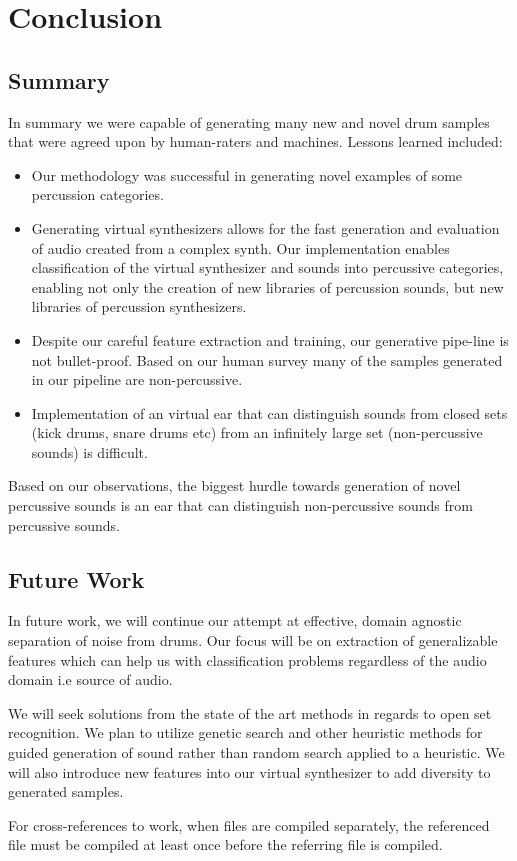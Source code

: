 \documentclass[\main/thesis.tex]{subfiles}
\begin{document}
\chapter{Conclusion}

\section{Summary}
\balance

In summary we were capable of generating many new and novel drum samples that were agreed upon by human-raters and machines. Lessons learned included:

\begin{itemize}
    \item Our methodology was successful in generating novel examples of some percussion categories.
    \item Generating virtual synthesizers allows for the fast generation and evaluation of audio created from a complex synth. Our implementation enables classification of the virtual synthesizer and sounds into percussive categories, enabling not only the creation of new libraries of percussion sounds, but new libraries of percussion synthesizers.
    \item Despite our careful feature extraction and training, our generative pipe-line is not bullet-proof. Based on our human survey many of the samples generated in our pipeline are non-percussive.
    \item Implementation of an virtual ear that can distinguish sounds from closed sets (kick drums, snare drums etc) from an infinitely large set (non-percussive sounds) is difficult. 
\end{itemize}

Based on our observations, the biggest hurdle towards generation of novel percussive sounds is an ear that can distinguish non-percussive sounds from percussive sounds. 

\section{Future Work}

In future work, we will continue our attempt at effective, domain agnostic separation of noise from drums.  Our focus will be on extraction of generalizable features which can help us with classification problems regardless of the audio domain i.e source of audio.
    
We will seek solutions from the state of the art methods in regards to open set recognition. We plan to utilize genetic search and other heuristic methods for guided generation of sound rather than random search applied to a heuristic. We will also introduce new features into our virtual synthesizer to add diversity to generated samples. 

\begin{note}[Caution:]
For cross-references to work, when files are compiled separately,
the referenced file must be compiled at least once before the
referring file is compiled.
\end{note}
\end{document}
